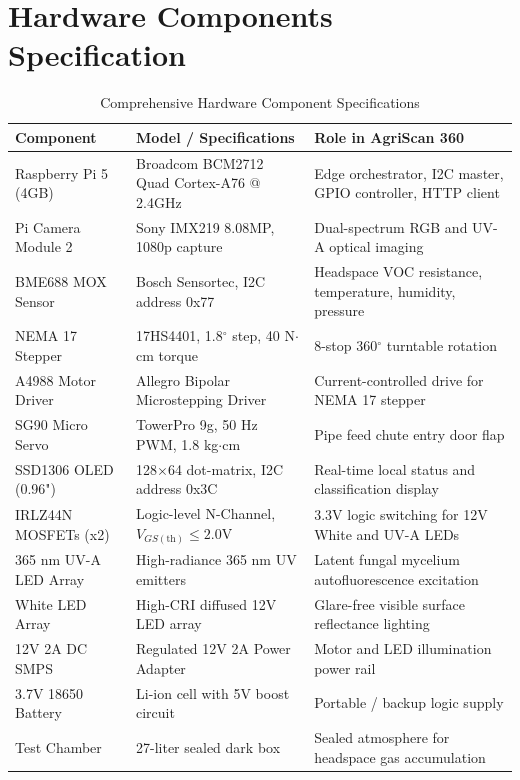\documentclass[11pt,a4paper]{article}
\begin{document}
\section{Hardware Components Specification}
\begin{table}[H]
\centering
\small
\begin{tabularx}{\textwidth}{l p{4.5cm} X}
\toprule
\textbf{Component} & \textbf{Model / Specifications} & \textbf{Role in AgriScan 360} \\
\midrule
Raspberry Pi 5 (4GB) & Broadcom BCM2712 Quad Cortex-A76 @ 2.4GHz & Edge orchestrator, I2C master, GPIO controller, HTTP client \\
Pi Camera Module 2 & Sony IMX219 8.08MP, 1080p capture & Dual-spectrum RGB and UV-A optical imaging \\
BME688 MOX Sensor & Bosch Sensortec, I2C address 0x77 & Headspace VOC resistance, temperature, humidity, pressure \\
NEMA 17 Stepper & 17HS4401, 1.8$^\circ$ step, 40 N$\cdot$cm torque & 8-stop 360$^\circ$ turntable rotation \\
A4988 Motor Driver & Allegro Bipolar Microstepping Driver & Current-controlled drive for NEMA 17 stepper \\
SG90 Micro Servo & TowerPro 9g, 50 Hz PWM, 1.8 kg$\cdot$cm & Pipe feed chute entry door flap \\
SSD1306 OLED (0.96") & 128$\times$64 dot-matrix, I2C address 0x3C & Real-time local status and classification display \\
IRLZ44N MOSFETs (x2) & Logic-level N-Channel, $V_{GS(\text{th})} \le 2.0$V & 3.3V logic switching for 12V White and UV-A LEDs \\
365 nm UV-A LED Array & High-radiance 365 nm UV emitters & Latent fungal mycelium autofluorescence excitation \\
White LED Array & High-CRI diffused 12V LED array & Glare-free visible surface reflectance lighting \\
12V 2A DC SMPS & Regulated 12V 2A Power Adapter & Motor and LED illumination power rail \\
3.7V 18650 Battery & Li-ion cell with 5V boost circuit & Portable / backup logic supply \\
Test Chamber & 27-liter sealed dark box & Sealed atmosphere for headspace gas accumulation \\
\bottomrule
\end{tabularx}
\caption{Comprehensive Hardware Component Specifications}
\end{table}
\end{document}
